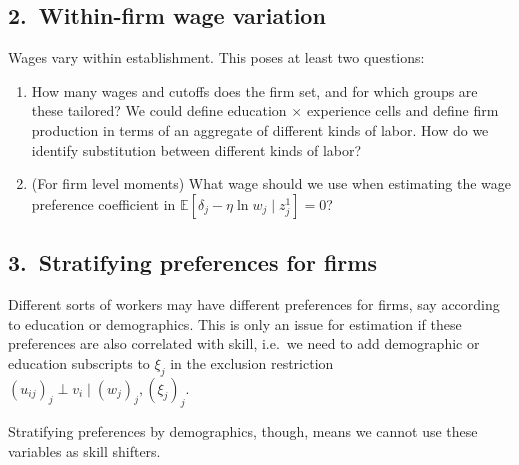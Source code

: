 \documentclass[11pt]{article}
\begin{document}
\subsection*{2.\ Within-firm wage variation}

Wages vary within establishment. This poses at least two questions:
\begin{enumerate}[nosep,label=\alph*.]
    \item How many wages and cutoffs does the firm set, and for which groups are these tailored? We could define education $\times$ experience cells and define firm production in terms of an aggregate of different kinds of labor. How do we identify substitution between different kinds of labor?
    \item (For firm level moments) What wage should we use when estimating the wage preference coefficient in $\mathbb{E}[\delta_j - \eta \ln w_j \mid z_j^1] = 0$?
\end{enumerate}

\subsection*{3.\ Stratifying preferences for firms}
Different sorts of workers may have different preferences for firms, say according to education or demographics. This is only an issue for estimation if these preferences are also correlated with skill, i.e.\ we need to add demographic or education subscripts to $\xi_j$ in the exclusion restriction $(u_{ij})_j \perp v_i \mid (w_j)_j, (\xi_j)_j$.

Stratifying preferences by demographics, though, means we cannot use these variables as skill shifters.


\end{document}
